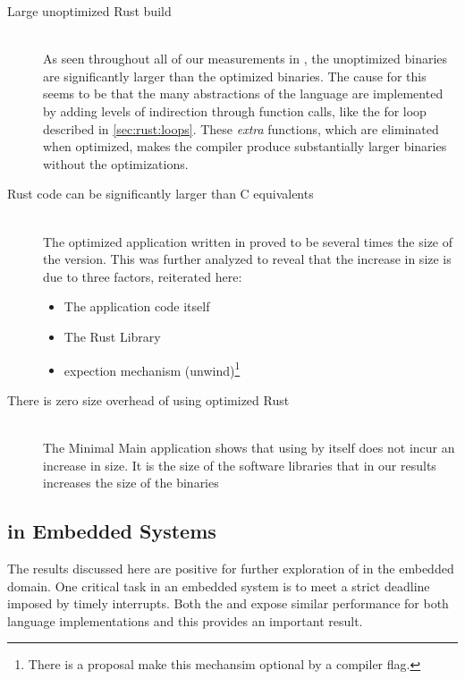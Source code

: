 \begin{description}

\item [Large unoptimized Rust build] \hfill \\
  As seen throughout all of our measurements in {\rust}, the unoptimized binaries are significantly larger than the optimized binaries.
  The cause for this seems to be that the many abstractions of the {\rust} language are implemented by adding levels of indirection through function calls, like the for loop described in \autoref{sec:rust:loops}.
  These \emph{extra} functions, which are eliminated when optimized, makes the compiler produce substantially larger binaries without the optimizations.

\item [Rust code can be significantly larger than C equivalents] \hfill \\
  The optimized {\tracker} application written in {\rust} proved to be several times the size of the {\C} version.
  This was further analyzed to reveal that the increase in size is due to three factors, reiterated here:
\begin{itemize}
\item The application code itself
\item The Rust Library
\item {\rust} expection mechanism (unwind)\footnote{There is a proposal make this mechansim optional by a compiler flag.}
\end{itemize}

\item [There is zero size overhead of using optimized Rust] \hfill \\
  The Minimal Main application shows that using {\rust} by itself does not incur an increase in size.
  It is the size of the software libraries that in our results increases the size of the {\rust} binaries

\end{description}

\subsection{{\rust} in Embedded Systems}

The results discussed here are positive for further exploration of {\rust} in the embedded domain.
One critical task in an embedded system is to meet a strict deadline imposed by timely interrupts.
Both the {\tracker} and {\cg} expose similar performance for both language implementations and this provides an important result.

